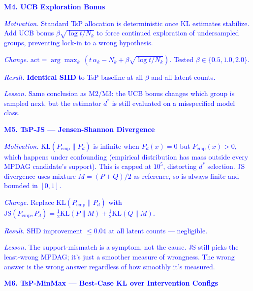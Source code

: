 \documentclass{article}
\begin{document}
\bigskip

\noindent\textcolor{blue}{\textbf{M4. UCB Exploration Bonus}}

\noindent\textcolor{blue}{\emph{Motivation.} Standard TsP allocation is deterministic once KL estimates stabilize. Add UCB bonus $\beta\sqrt{\log t / N_k}$ to force continued exploration of undersampled groups, preventing lock-in to a wrong hypothesis.}

\noindent\textcolor{blue}{\emph{Change.} $\text{act} = \arg\max_k\,(t\,\alpha_k - N_k + \beta\sqrt{\log t / N_k})$. Tested $\beta \in \{0.5, 1.0, 2.0\}$.}

\noindent\textcolor{blue}{\emph{Result.} \textbf{Identical SHD} to TsP baseline at all $\beta$ and all latent counts.}

\noindent\textcolor{blue}{\emph{Lesson.} Same conclusion as M2/M3: the UCB bonus changes which group is sampled next, but the estimator $d^*$ is still evaluated on a misspecified model class.}

\bigskip

\noindent\textcolor{blue}{\textbf{M5. TsP-JS — Jensen-Shannon Divergence}}

\noindent\textcolor{blue}{\emph{Motivation.} KL$(P_\text{emp} \| P_d)$ is infinite when $P_d(x)=0$ but $P_\text{emp}(x)>0$, which happens under confounding (empirical distribution has mass outside every MPDAG candidate's support). This is capped at $10^5$, distorting $d^*$ selection. JS divergence uses mixture $M = (P+Q)/2$ as reference, so is always finite and bounded in $[0,1]$.}

\noindent\textcolor{blue}{\emph{Change.} Replace $\text{KL}(P_\text{emp} \| P_d)$ with $\text{JS}(P_\text{emp}, P_d) = \tfrac{1}{2}\text{KL}(P\|M) + \tfrac{1}{2}\text{KL}(Q\|M)$.}

\noindent\textcolor{blue}{\emph{Result.} SHD improvement $\leq 0.04$ at all latent counts — negligible.}

\noindent\textcolor{blue}{\emph{Lesson.} The support-mismatch is a symptom, not the cause. JS still picks the least-wrong MPDAG; it's just a smoother measure of wrongness. The wrong answer is the wrong answer regardless of how smoothly it's measured.}

\bigskip

\noindent\textcolor{blue}{\textbf{M6. TsP-MinMax — Best-Case KL over Intervention Configs}}
\end{document}
